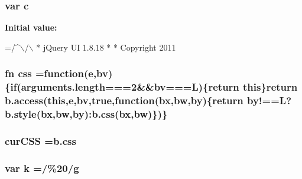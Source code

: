 \subsubsection[{c}]{\setlength{\rightskip}{0pt plus 5cm}var c}\label{docs_2_programmer's_manual_2html_2jquery_8js_abce695e0af988ece0826d9ad59b8160d}
{\bfseries Initial value\+:}
\begin{DoxyCode}
=/^\(\backslash\)/\(\backslash\)
 * jQuery UI 1.8.18
 *
 * Copyright 2011
\end{DoxyCode}
\hypertarget{docs_2_programmer's_manual_2html_2jquery_8js_a89ad527fcd82c01ebb587332f5b4fcd4}{}
\subsubsection[{css}]{ fn css =function(e,bv)\{{\bf if}(arguments.\+length===2\&\&bv==={\bf L})\{return this\}return {\bf b.\+access}(this,e,bv,true,function(bx,bw,by)\{return by!=={\bf L}?b.\+style(bx,bw,by)\+:b.\+css(bx,bw)\})\}}\label{docs_2_programmer's_manual_2html_2jquery_8js_a89ad527fcd82c01ebb587332f5b4fcd4}
\hypertarget{docs_2_programmer's_manual_2html_2jquery_8js_a88b21f8ba3af86d6981b1da520ece33b}{}
\subsubsection[{cur\+C\+S\+S}]{ cur\+C\+S\+S ={\bf b.\+css}}\label{docs_2_programmer's_manual_2html_2jquery_8js_a88b21f8ba3af86d6981b1da520ece33b}
\hypertarget{docs_2_programmer's_manual_2html_2jquery_8js_ab26645c014aa005ecedef329ecf58c99}{}
\subsubsection[{k}]{\setlength{\rightskip}{0pt plus 5cm}var k =/\%20/g}\label{docs_2_programmer's_manual_2html_2jquery_8js_ab26645c014aa005ecedef329ecf58c99}
\hypertarget{docs_2_programmer's_manual_2html_2jquery_8js_a38ee4c0b5f4fe2a18d0c783af540d253}{}
